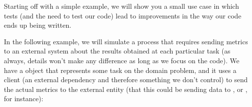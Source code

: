 \documentclass[a4paper,10pt,english]{sphinxmanual}
\begin{document}
Starting off with a simple example, we will show you a small use case in which tests (and
the need to test our code) lead to improvements in the way our code ends up being written.

In the following example, we will simulate a process that requires sending metrics to an
external system about the results obtained at each particular task (as always, details won’t
make any difference as long as we focus on the code). We have a  object that
represents some task on the domain problem, and it uses a  client (an external
dependency and therefore something we don’t control) to send the actual metrics to the
external entity (that this could be sending data to , or , for instance):
\end{document}
